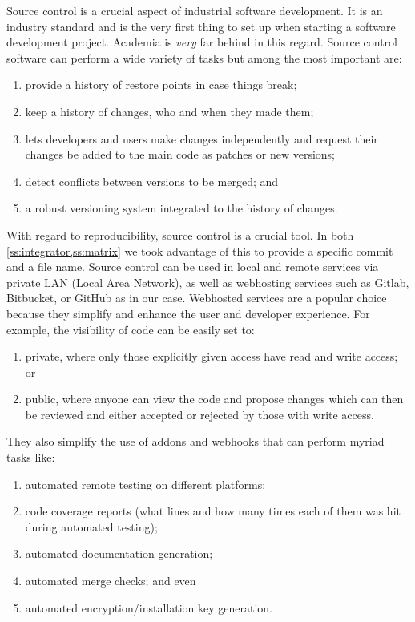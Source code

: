 Source control is a crucial aspect of industrial software development. It is an industry standard and is the very first thing to set up when starting a software development project. Academia is \emph{very} far behind in this regard. Source control software can perform a wide variety of tasks but among the most important are:
\begin{enumerate}
  \item provide a history of restore points in case things break;
  \item keep a history of changes, who and when they made them;
  \item lets developers and users make changes independently and request their changes be added to the main code as patches or new versions;
  \item detect conflicts between versions to be merged; and
  \item a robust versioning system integrated to the history of changes.
\end{enumerate}

With regard to reproducibility, source control is a crucial tool. In both \cref{ss:integrator,ss:matrix} we took advantage of this to provide a specific commit and a file name. Source control can be used in local and remote services via private LAN (Local Area Network), as well as webhosting services such as Gitlab, Bitbucket, or GitHub as in our case. Webhosted services are a popular choice because they simplify and enhance the user and developer experience. For example, the visibility of code can be easily set to:
\begin{enumerate}
  \item private, where only those explicitly given access have read and write access; or
  \item public, where anyone can view the code and propose changes which can then be reviewed and either accepted or rejected by those with write access.
\end{enumerate}
They also simplify the use of addons and webhooks that can perform myriad tasks like:
\begin{enumerate}
  \item automated remote testing on different platforms;
  \item code coverage reports (what lines and how many times each of them was hit during automated testing);
  \item automated documentation generation;
  \item automated merge checks; and even
  \item automated encryption/installation key generation.
\end{enumerate}

